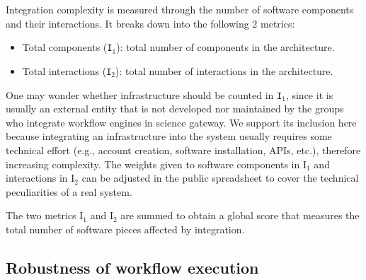 \documentclass[preprint,3p,twocolumn]{elsarticle}
\newcommand{\correction}[1]{\color{blue}#1\color{black}\xspace}
\begin{document}
\correction{Integration complexity} is measured through the number of
software components and their interactions. It breaks down into the
following 2 metrics:
\begin{itemize}[leftmargin=0cm,itemindent=0.35cm,itemsep=0cm]
\item Total components (\texttt{I$_1$}): total number of components in
  the architecture.
\item Total interactions (\texttt{I$_2$}): total number of
  interactions in the architecture.
\end{itemize}
One may wonder whether infrastructure should be counted in
\texttt{I$_1$}, since it is usually an external entity that is not
developed nor maintained by the groups who integrate workflow engines
in science gateway. We support its inclusion here because integrating
an infrastructure into the system usually requires some technical
effort (e.g., account creation, software installation, APIs, etc.),
therefore increasing complexity. \correction{The weights given to
  software components in I$_1$ and interactions in I$_2$ can be
  adjusted in the public spreadsheet to cover the technical
  peculiarities of a real system.}

 The two metrics
\correction{I$_1$ and I$_2$} are summed to obtain a global score that
measures the total number of software pieces affected by integration.

\subsection{\correction{Robustness of workflow execution}}
\end{document}
